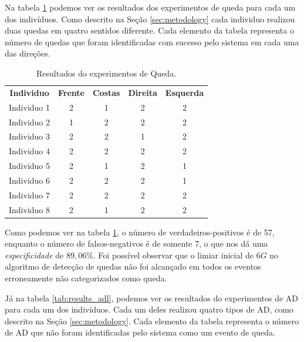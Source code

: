 Na tabela \ref{tab:results_fall} podemos ver os resultados dos experimentos de queda para cada um dos indivíduos. Como descrito na Seção \ref{sec:metodology} cada individuo realizou duas quedas em quatro sentidos diferente. Cada elemento da tabela representa o número de quedas que foram identificadas com sucesso pelo sistema em cada uma das direções. 

\begin{table}[h]
	\centering
	\caption{Resultados do experimentos de Queda.}
	\label{tab:results_fall}
	\begin{tabular}{c|c|c|c|c}
		\hline
		\textbf{Individuo}  & \textbf{Frente} 	& \textbf{Costas}   &    \textbf{Direita}    & \textbf{Esquerda} 	 \\
		Individuo 1         & 2        		    & 1            		& 2      		 		 & 2         \\  
		Individuo 2         & 1        		    & 2            		& 2      		 		 & 2         \\
		Individuo 3         & 2        		    & 2            		& 1      		 		 & 2         \\
		Individuo 4         & 2        		    & 2            		& 2      		 		 & 2         \\
		Individuo 5         & 2        		    & 1            		& 2      		 		 & 1         \\
		Individuo 6         & 2        		    & 2            		& 2      		 		 & 1         \\
		Individuo 7         & 2        		    & 2            		& 2      		 		 & 2         \\
		Individuo 8         & 2        		    & 1            		& 2      		 		 & 2         \\
	\end{tabular}
\end{table}


Como podemos ver na tabela \ref{tab:results_fall}, o número de verdadeiros-positivos é de 57, enquanto o número de falsos-negativos é de somente 7, o que nos dá uma \textit{especificidade} de $89,06\%$. Foi possível observar que o limiar inicial de $6G$ no algoritmo de detecção de quedas não foi alcançado em todos os eventos erroneamente não categorizados como queda.


Já na tabela \ref{tab:results_adl}, podemos ver os resultados do experimentos de \ac{AD} para cada um dos indivíduos. Cada um deles realizou quatro tipos de \ac{AD}, como descrito na Seção \ref{sec:metodology}. Cada elemento da tabela representa o número de \ac{AD} que não foram identificadas pelo sistema como um evento de queda. 


